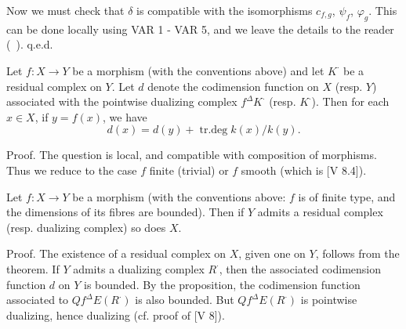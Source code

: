 \documentclass[12pt]{book}
\begin{document}
Now we must check that \(\delta\) is compatible with the isomorphisms \(c_{f,g}\), \(\psi_{f}\), \(\varphi_{g}\).
This can be done locally using VAR 1 - VAR 5, and we leave the details to the reader (~). q.e.d.

\begin{proposition}
Let \(f: X \to Y\) be a morphism (with the conventions above) and let \(K^{\cdot}\) be a residual complex on \(Y\).
Let \(d\) denote the codimension function on \(X\) (resp. \(Y\)) associated with the pointwise dualizing complex \(f^{\Delta} K^{\cdot}\) (resp. \(K^{\cdot}\)).
Then for each \(x \in X\), if \(y=f(x)\), we have
\[d(x)=d(y)+\operatorname{tr.deg}k(x)/k(y) .\]
\end{proposition}

\setcounter{page}{334}
Proof. The question is local, and compatible with composition of morphisms.
Thus we reduce to the case \(f\) finite (trivial) or \(f\) smooth (which is [V 8.4]).

\begin{corollary}
Let \(f: X \to Y\) be a morphism (with the conventions above: \(f\) is of finite type, and the dimensions of its fibres are bounded).
Then if \(Y\) admits a residual complex (resp. dualizing complex) so does \(X\).
\end{corollary}

Proof. The existence of a residual complex on \(X\), given one on \(Y\), follows from the theorem.
If \(Y\) admits a dualizing complex \(R^{\cdot}\), then the associated codimension function \(d\) on \(Y\) is bounded.
By the proposition, the codimension function associated to \(Q f^{\Delta} E(R^{\cdot})\) is also bounded.
But \(Q f^{\Delta} E(R^{\cdot})\) is pointwise dualizing, hence dualizing (cf. proof of [V 8]).
\end{document}
